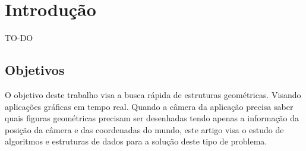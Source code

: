 \chapter{Introdução}

TO-DO


\section{Objetivos}

O objetivo deste trabalho visa a busca rápida de estruturas geométricas.
Visando aplicações gráficas em tempo real.
Quando a câmera da aplicação precisa saber quais figuras geométricas precisam ser desenhadas
tendo apenas a informação da posição da câmera e das coordenadas do mundo, este artigo visa
o estudo de algoritmos e estruturas de dados para a solução deste tipo de problema.






